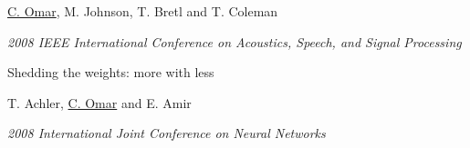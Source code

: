 \documentclass[10pt,letterpaper]{article}
\renewenvironment{itemize}{
  \begin{list}{}{
    \setlength{\leftmargin}{1.25em}
    \setlength{\itemsep}{0.25em}
    \setlength{\parskip}{0pt}
    \setlength{\parsep}{0.2em}
  }
}{
  \end{list}
}
\begin{document}
\begin{enumerate}[leftmargin=*, labelindent=6.5em, font=\bfseries]
        \begin{itemize}
          \item \underline{C. Omar}, M. Johnson, T. Bretl and T. Coleman
          \item \textit{2008 IEEE International Conference on Acoustics, Speech, and Signal Processing}
        \end{itemize}
  \item[IJCNN 2008] Shedding the weights: more with less
        \begin{itemize}
          \item T. Achler, \underline{C. Omar} and E. Amir
          \item \textit{2008 International Joint Conference on Neural Networks}
        \end{itemize}

\end{enumerate}


\end{document}
